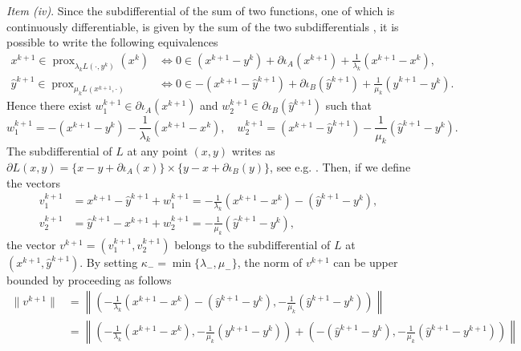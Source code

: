 \documentclass[pdflatex,sn-mathphys-num]{sn-jnl}
\numberwithin{equation}{section}%
\newcommand{\prox}{\operatorname{prox}}
\newcommand{\iif}{\Leftrightarrow}
\theoremstyle{thmstyleone}%
\theoremstyle{thmstyletwo}%
\theoremstyle{thmstylethree}%
\begin{document}
\begin{appendices}
{\it Item (iv)}. Since the subdifferential of the sum of two functions, one of which is continuously differentiable, is given by the sum of the two subdifferentials \cite[Exercise 8.8]{Rockafellar-Wets-1998}, it is possible to write the following equivalences
\begin{align*}
    x^{k+1} \in \prox_{\lambda_{k} L(\cdot,y^{k})} (x^{k}) 
    &\iif 0 \in (x^{k+1} - y^{k}) + \partial \iota_A(x^{k+1}) + \frac{1}{\lambda_{k}} (x^{k+1} - x^{k}), \nonumber \\
    \hat y^{k+1} \in \prox_{\mu_{k} L(x^{k+1},\cdot)} 
    &\iif 0 \in -(x^{k+1} - \hat y^{k+1}) + \partial \iota_B(\hat y^{k+1}) + \frac{1}{\mu_{k}} (\hat y^{k+1} - y^{k}).
\end{align*}
Hence there exist $w_1^{k+1} \in \partial \iota_A(x^{k+1})$ and $w_2^{k+1} \in \partial \iota_B(\hat y^{k+1})$ 
such that
\begin{equation*}
    w_1^{k+1} = -(x^{k+1} - y^{k}) - \frac{1}{\lambda_{k}} (x^{k+1} - x^{k}), \quad
    w_2^{k+1} = (x^{k+1} - \hat y^{k+1}) - \frac{1}{\mu_{k}} (\hat y^{k+1} - y^{k}).
\end{equation*}
The subdifferential of $L$ at any point $(x,y)$ writes as $\partial L(x,y) = \{ x - y + \partial \iota_A(x) \} \times \{ y - x + \partial \iota_B(y) \}$, see e.g. \cite[Proposition 2.1]{attouch2010proximal}. Then, if we define the vectors
\begin{align*}
    v_1^{k+1} &= x^{k+1} - \hat y^{k+1} + w_1^{k+1}=-\frac{1}{\lambda_k}(x^{k+1}-x^k)-(\hat{y}^{k+1}-y^k),  \\
    v_2^{k+1} &= \hat y^{k+1} - x^{k+1} + w_2^{k+1}=-\frac{1}{\mu_k}(\hat{y}^{k+1}-y^k), 
\end{align*}
the vector $v^{k+1} = (v_1^{k+1}, v_2^{k+1})$ belongs to the subdifferential of $L$ at $(x^{k+1},\hat{y}^{k+1})$. By setting $\kappa_- = \min\{\lambda_{-},\mu_{-}\}$, the norm of $v^{k+1}$ can be upper bounded by proceeding as follows
\begin{align}
    \|v^{k+1}\|&= \left\| \left( -\frac{1}{\lambda_{k}} (x^{k+1} - x^{k}) - ( \hat y^{k+1} - y^{k}), - \frac{1}{\mu_{k}} (\hat y^{k+1} - y^{k}) \right) \right\|\nonumber\\
    &= \left\| 
    \left(
    -\frac{1}{\lambda_{k}} (x^{k+1} - x^{k}),
                        - \frac{1}{\mu_{k}} (y^{k+1}- y^{k})
                    \right) + 
                    \left(
                        - ( \hat y^{k+1} - y^{k}),
                        - \frac{1}{\mu_{k}} (\hat y^{k+1} - y^{k+1})
                    \right) \right\|\nonumber\\

\end{align}
\end{appendices}
\end{document}
